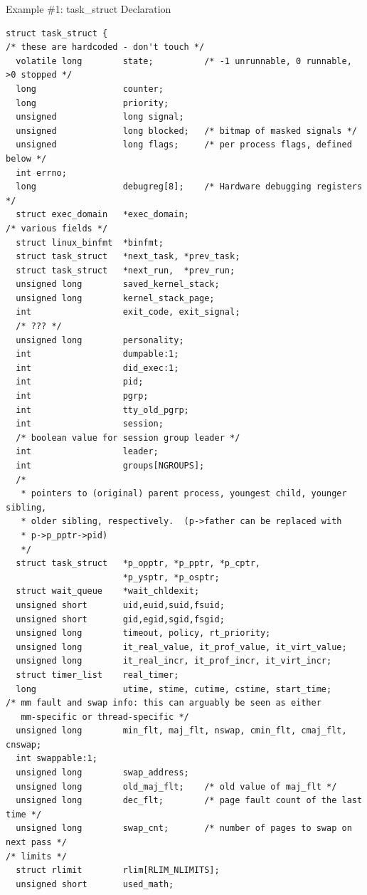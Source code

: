 \documentclass[12pt]{extarticle}
\newenvironment{myindentpar}[1]%
 {\begin{list}{}%
         {\setlength{\leftmargin}{#1}}%
         \item[]%
 }
 {\end{list}}
\begin{document}
\begin{myindentpar}{5mm}
\newpage
\begin{center}
    Example \#1: task\_struct Declaration
\end{center}
\begin{lstlisting}[frame=single]
struct task_struct {
/* these are hardcoded - don't touch */
  volatile long        state;          /* -1 unrunnable, 0 runnable, >0 stopped */
  long                 counter;
  long                 priority;
  unsigned             long signal;
  unsigned             long blocked;   /* bitmap of masked signals */
  unsigned             long flags;     /* per process flags, defined below */
  int errno;
  long                 debugreg[8];    /* Hardware debugging registers */
  struct exec_domain   *exec_domain;
/* various fields */
  struct linux_binfmt  *binfmt;
  struct task_struct   *next_task, *prev_task;
  struct task_struct   *next_run,  *prev_run;
  unsigned long        saved_kernel_stack;
  unsigned long        kernel_stack_page;
  int                  exit_code, exit_signal;
  /* ??? */
  unsigned long        personality;
  int                  dumpable:1;
  int                  did_exec:1;
  int                  pid;
  int                  pgrp;
  int                  tty_old_pgrp;
  int                  session;
  /* boolean value for session group leader */
  int                  leader;
  int                  groups[NGROUPS];
  /* 
   * pointers to (original) parent process, youngest child, younger sibling,
   * older sibling, respectively.  (p->father can be replaced with 
   * p->p_pptr->pid)
   */
  struct task_struct   *p_opptr, *p_pptr, *p_cptr, 
                       *p_ysptr, *p_osptr;
  struct wait_queue    *wait_chldexit;  
  unsigned short       uid,euid,suid,fsuid;
  unsigned short       gid,egid,sgid,fsgid;
  unsigned long        timeout, policy, rt_priority;
  unsigned long        it_real_value, it_prof_value, it_virt_value;
  unsigned long        it_real_incr, it_prof_incr, it_virt_incr;
  struct timer_list    real_timer;
  long                 utime, stime, cutime, cstime, start_time;
/* mm fault and swap info: this can arguably be seen as either
   mm-specific or thread-specific */
  unsigned long        min_flt, maj_flt, nswap, cmin_flt, cmaj_flt, cnswap;
  int swappable:1;
  unsigned long        swap_address;
  unsigned long        old_maj_flt;    /* old value of maj_flt */
  unsigned long        dec_flt;        /* page fault count of the last time */
  unsigned long        swap_cnt;       /* number of pages to swap on next pass */
/* limits */
  struct rlimit        rlim[RLIM_NLIMITS];
  unsigned short       used_math;

\end{lstlisting}
\end{myindentpar}
\end{document}
